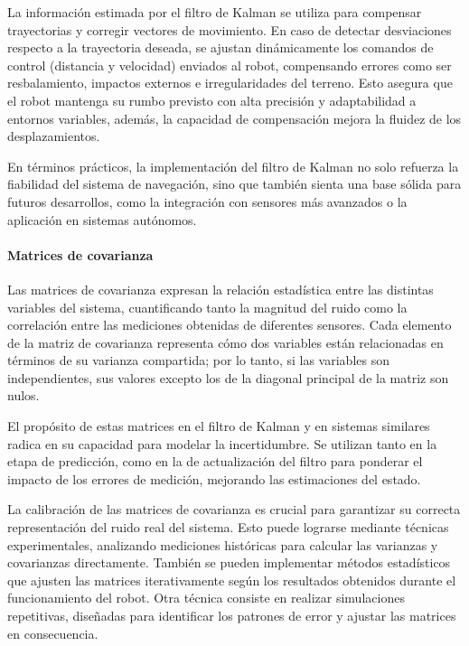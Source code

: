 La información estimada por el filtro de Kalman se utiliza para compensar trayectorias y corregir vectores de movimiento. En caso de detectar desviaciones respecto a la trayectoria deseada, se ajustan dinámicamente los comandos de control (distancia y velocidad) enviados al robot, compensando errores como ser resbalamiento, impactos externos e irregularidades del terreno. Esto asegura que el robot mantenga su rumbo previsto con alta precisión y adaptabilidad a entornos variables, además, la capacidad de compensación mejora la fluidez de los desplazamientos.

En términos prácticos, la implementación del filtro de Kalman no solo refuerza la fiabilidad del sistema de navegación, sino que también sienta una base sólida para futuros desarrollos, como la integración con sensores más avanzados o la aplicación en sistemas autónomos.


\paragraph{Matrices de covarianza} \mbox{} \vspace{10pt}

Las matrices de covarianza expresan la relación estadística entre las distintas variables del sistema, cuantificando tanto la magnitud del ruido como la correlación entre las mediciones obtenidas de diferentes sensores. Cada elemento de la matriz de covarianza representa cómo dos variables están relacionadas en términos de su varianza compartida; por lo tanto, si las variables son independientes, sus valores excepto los de la diagonal principal de la matriz son nulos.

El propósito de estas matrices en el filtro de Kalman y en sistemas similares radica en su capacidad para modelar la incertidumbre. Se utilizan tanto en la etapa de predicción, como en la de actualización del filtro para ponderar el impacto de los errores de medición, mejorando las estimaciones del estado. \cite{tzafestas2013introduction} \cite{Rigatos01062007}

La calibración de las matrices de covarianza es crucial para garantizar su correcta representación del ruido real del sistema. Esto puede lograrse mediante técnicas experimentales, analizando mediciones históricas para calcular las varianzas y covarianzas directamente. También se pueden implementar métodos estadísticos que ajusten las matrices iterativamente según los resultados obtenidos durante el funcionamiento del robot. Otra técnica consiste en realizar simulaciones repetitivas, diseñadas para identificar los patrones de error y ajustar las matrices en consecuencia. \cite{Bang18}

